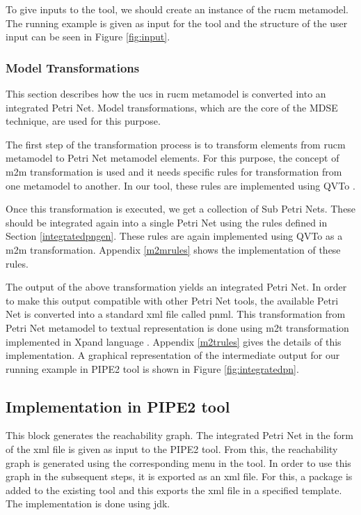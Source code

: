 To give inputs to the tool, we should create an instance of the \gls{rucm} metamodel. The running example is given as input for the tool and the structure of the user input can be seen in Figure \ref{fig:input}.

\subsubsection{Model Transformations}
This section describes how the \gls{ucs} in \gls{rucm} metamodel is converted into an integrated Petri Net. Model transformations, which are the core of the MDSE technique, are used for this purpose.

The first step of the transformation process is to transform elements from \gls{rucm} metamodel to Petri Net metamodel elements. For this purpose, the concept of \gls{m2m} transformation is used and it needs specific rules for transformation from one metamodel to another.  In our tool, these rules are implemented using QVTo \cite{eclipseqvt}. 

Once this transformation is executed, we get a collection of Sub Petri Nets. These should be integrated again into a single Petri Net using the rules defined in Section \ref{integratedpngen}. These rules are again implemented using QVTo as a \gls{m2m} transformation. Appendix \ref{m2mrules} shows the implementation of these rules.

The output of the above transformation yields an integrated Petri Net. In order to make this output compatible with other Petri Net tools, the available Petri Net is converted into a standard xml file called \gls{pnml}. This transformation from Petri Net metamodel to textual representation is done using \gls{m2t} transformation implemented in Xpand language \cite{eclipsem2t}. Appendix \ref{m2trules} gives the details of this implementation. A graphical representation of the intermediate output for our running example in PIPE2 tool is shown in Figure \ref{fig:integratedpn}.

\subsection{Implementation in PIPE2 tool}
This block generates the reachability graph. The integrated Petri Net in the form of the xml file is given as input to the PIPE2 tool. From this, the reachability graph is generated using the corresponding menu in the tool. In order to use this graph in the subsequent steps, it is exported as an xml file. For this, a package is added to the existing tool and this exports the xml file in a specified template. The implementation is done using \gls{jdk}.

